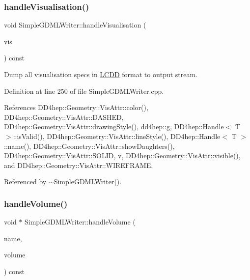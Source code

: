 \subsubsection{\texorpdfstring{handle\+Visualisation()}{handleVisualisation()}}
{\footnotesize\ttfamily void Simple\+G\+D\+M\+L\+Writer\+::handle\+Visualisation (\begin{DoxyParamCaption}\item[{const \hyperlink{class_d_d4hep_1_1_geometry_1_1_geo_handler_types_abeb370eb52c06e48c61e6c8bc19b66ab}{Vis\+Refs} \&}]{vis }\end{DoxyParamCaption}) const}



Dump all visualisation specs in \hyperlink{class_d_d4hep_1_1_geometry_1_1_l_c_d_d}{L\+C\+DD} format to output stream. 



Definition at line 250 of file Simple\+G\+D\+M\+L\+Writer.\+cpp.



References D\+D4hep\+::\+Geometry\+::\+Vis\+Attr\+::color(), D\+D4hep\+::\+Geometry\+::\+Vis\+Attr\+::\+D\+A\+S\+H\+ED, D\+D4hep\+::\+Geometry\+::\+Vis\+Attr\+::drawing\+Style(), dd4hep\+::g, D\+D4hep\+::\+Handle$<$ T $>$\+::is\+Valid(), D\+D4hep\+::\+Geometry\+::\+Vis\+Attr\+::line\+Style(), D\+D4hep\+::\+Handle$<$ T $>$\+::name(), D\+D4hep\+::\+Geometry\+::\+Vis\+Attr\+::show\+Daughters(), D\+D4hep\+::\+Geometry\+::\+Vis\+Attr\+::\+S\+O\+L\+ID, v, D\+D4hep\+::\+Geometry\+::\+Vis\+Attr\+::visible(), and D\+D4hep\+::\+Geometry\+::\+Vis\+Attr\+::\+W\+I\+R\+E\+F\+R\+A\+ME.



Referenced by $\sim$\+Simple\+G\+D\+M\+L\+Writer().

\hypertarget{class_d_d4hep_1_1_geometry_1_1_simple_g_d_m_l_writer_a1374f3118e46fea905442b228419c16d}{}\label{class_d_d4hep_1_1_geometry_1_1_simple_g_d_m_l_writer_a1374f3118e46fea905442b228419c16d} 
\subsubsection{\texorpdfstring{handle\+Volume()}{handleVolume()}}
{\footnotesize\ttfamily void $\ast$ Simple\+G\+D\+M\+L\+Writer\+::handle\+Volume (\begin{DoxyParamCaption}\item[{const std\+::string \&}]{name,  }\item[{const T\+Geo\+Volume $\ast$}]{volume }\end{DoxyParamCaption}) const\hspace{0.3cm}{\ttfamily [virtual]}}



